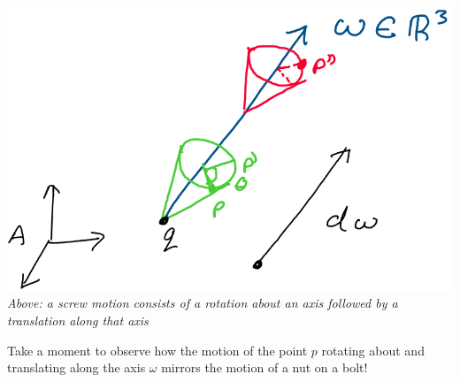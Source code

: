 \documentclass[oneside]{book}
\begin{document}
\begin{center}
    \includegraphics[scale=0.4]{images/screwComponents.png}\\
    \textit{Above: a screw motion consists of a rotation about an axis followed by a translation along that axis}
\end{center}
Take a moment to observe how the motion of the point $p$ rotating about and translating along the axis $\omega$ mirrors the motion of a nut on a bolt!
\end{document}
